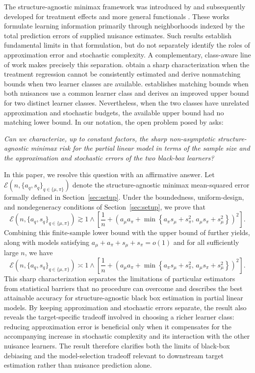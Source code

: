 \documentclass[11pt]{article}
\begin{document}
The structure-agnostic minimax framework was introduced by
\citet{balakrishnan2026fundamental} and subsequently developed for treatment
effects and more general functionals
\citep{jin2025structure,jin2026sharp}. These works formulate learning
information primarily through neighborhoods indexed by the total prediction
errors of supplied nuisance estimates. Such results establish fundamental
limits in that formulation, but do not separately identify the roles of
approximation error and stochastic complexity. A complementary, class-aware
line of work makes precisely this separation. \citet{gu2026taming} obtain a
sharp characterization when the treatment regression cannot be consistently
estimated and derive nonmatching bounds when two learner classes are
available. \citet{gu2026optimal} establishes matching bounds when both nuisances
use a common learner class and derives an improved upper bound for two distinct
learner classes. Nevertheless, when the two classes have unrelated
approximation and stochastic budgets, the available upper bound had no
matching lower bound. In our notation, the open problem posed by
\citet{gu2025open} asks:

\begin{center}
\emph{
Can we characterize, up to constant factors, the sharp non-asymptotic
structure-agnostic minimax risk for the partial linear model in terms
of the sample size and the approximation and stochastic errors
of the two black-box learners?
}
\end{center}

In this paper, we resolve this question with an affirmative answer. Let
\(\mathcal E(n,\{a_q,s_q\}_{q\in\{\mu,\pi\}})\) denote the
structure-agnostic minimax mean-squared error formally defined in
Section~\ref{sec:setup}.
Under the boundedness, uniform-design, and nondegeneracy conditions of
Section~\ref{sec:setup}, we prove that
\[
\mathcal E\left(n,\{a_q,s_q\}_{q\in\{\mu,\pi\}}\right)
\gtrsim
1\wedge\left[
\frac1n+
\left(
a_\mu a_\pi
+\min\left\{
a_\pi s_\mu+s_\pi^2,\,
a_\mu s_\pi+s_\mu^2
\right\}
\right)^2
\right].
\]
Combining this finite-sample lower bound with the upper bound of
\citet{gu2026optimal} further yields, along with models satisfying
\(a_\mu+a_\pi+s_\mu+s_\pi=o(1)\) and for all sufficiently large \(n\), we have
\[
\mathcal E\left(n,\{a_q,s_q\}_{q\in\{\mu,\pi\}}\right)
\asymp
1\wedge\left[
\frac1n+
\left(
a_\mu a_\pi
+\min\left\{
a_\pi s_\mu+s_\pi^2,\,
a_\mu s_\pi+s_\mu^2
\right\}
\right)^2
\right].
\]
This sharp characterization separates the limitations of particular
estimators from statistical barriers that no procedure can overcome and 
describes the best attainable accuracy for structure-agnostic black box estimation in partial linear models. By keeping approximation and stochastic errors
separate, the result also reveals the target-specific tradeoff involved in
choosing a richer learner class: reducing approximation error is beneficial
only when it compensates for the accompanying increase in stochastic
complexity and its interaction with the other nuisance learners. The result
therefore clarifies both the limits of black-box debiasing and the
model-selection tradeoff relevant to downstream target estimation rather than
nuisance prediction alone.
\end{document}
